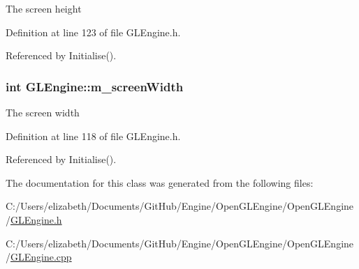 The screen height 



Definition at line 123 of file G\+L\+Engine.\+h.



Referenced by Initialise().

\subsubsection[{\texorpdfstring{m\+\_\+screen\+Width}{m_screenWidth}}]{\setlength{\rightskip}{0pt plus 5cm}int G\+L\+Engine\+::m\+\_\+screen\+Width\hspace{0.3cm}{\ttfamily [private]}}\hypertarget{class_g_l_engine_a9d34663f2b656c3c9e5af29e5e18a6e5}{}\label{class_g_l_engine_a9d34663f2b656c3c9e5af29e5e18a6e5}


The screen width 



Definition at line 118 of file G\+L\+Engine.\+h.



Referenced by Initialise().



The documentation for this class was generated from the following files\+:\begin{DoxyCompactItemize}
\item 
C\+:/\+Users/elizabeth/\+Documents/\+Git\+Hub/\+Engine/\+Open\+G\+L\+Engine/\+Open\+G\+L\+Engine/\hyperlink{_g_l_engine_8h}{G\+L\+Engine.\+h}\item 
C\+:/\+Users/elizabeth/\+Documents/\+Git\+Hub/\+Engine/\+Open\+G\+L\+Engine/\+Open\+G\+L\+Engine/\hyperlink{_g_l_engine_8cpp}{G\+L\+Engine.\+cpp}\end{DoxyCompactItemize}
